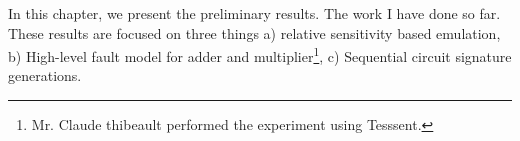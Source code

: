 In this chapter, we present the preliminary results. The work I have done so far. These results are focused on three things a) relative sensitivity based emulation, b) High-level fault model for adder and multiplier\footnote{Mr. Claude thibeault performed the experiment using Tesssent. }, c) Sequential circuit signature generations.


\label{preliminary}

